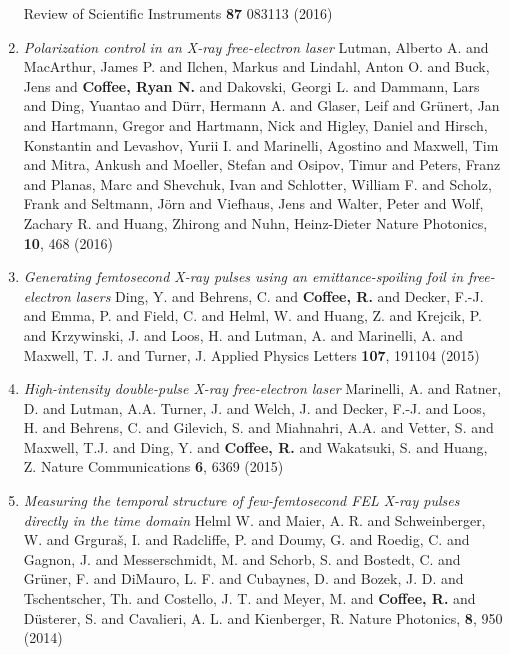 \begin{enumerate}
Review of Scientific Instruments \textbf{87} 083113 (2016)
\item \textit{Polarization control in an X-ray free-electron laser}
Lutman, Alberto A. and MacArthur, James P. and Ilchen, Markus and Lindahl, Anton O. and Buck, Jens and \textbf{Coffee, Ryan N.} and Dakovski, Georgi L. and Dammann, Lars and Ding, Yuantao and Dürr, Hermann A. and Glaser, Leif and Grünert, Jan and Hartmann, Gregor and Hartmann, Nick and Higley, Daniel and Hirsch, Konstantin and Levashov, Yurii I. and Marinelli, Agostino and Maxwell, Tim and Mitra, Ankush and Moeller, Stefan and Osipov, Timur and Peters, Franz and Planas, Marc and Shevchuk, Ivan and Schlotter, William F. and Scholz, Frank and Seltmann, Jörn and Viefhaus, Jens and Walter, Peter and Wolf, Zachary R. and Huang, Zhirong and Nuhn, Heinz-Dieter
Nature Photonics, \textbf{10}, 468 (2016)
\item \textit{Generating femtosecond X-ray pulses using an emittance-spoiling foil in free-electron lasers}
Ding, Y. and Behrens, C. and \textbf{Coffee, R.} and Decker, F.-J. and Emma, P. and Field, C. and Helml, W. and Huang, Z. and Krejcik, P. and Krzywinski, J. and Loos, H. and Lutman, A. and Marinelli, A. and Maxwell, T. J. and Turner, J.
Applied Physics Letters \textbf{107}, 191104 (2015)
\item \textit{High-intensity double-pulse X-ray free-electron laser}
Marinelli, A. and Ratner, D. and Lutman, A.A. Turner, J. and Welch, J. and Decker, F.-J. and Loos, H. and Behrens, C. and Gilevich, S. and Miahnahri, A.A. and Vetter, S. and Maxwell, T.J. and Ding, Y. and \textbf{Coffee, R.} and Wakatsuki, S. and Huang, Z.
Nature Communications \textbf{6}, 6369 (2015)
\item \textit{Measuring the temporal structure of few-femtosecond FEL X-ray pulses directly in the time domain}
Helml W. and Maier, A. R. and Schweinberger, W. and Grgura\v{s}, I. and Radcliffe, P. and Doumy, G. and Roedig, C. and Gagnon, J. and Messerschmidt, M. and Schorb, S. and Bostedt, C. and Gr\"{u}ner, F. and DiMauro, L. F. and Cubaynes, D. and Bozek, J. D. and Tschentscher, Th. and Costello, J. T. and Meyer, M. and \textbf{Coffee, R.} and D\"{u}sterer, S. and Cavalieri, A. L. and Kienberger, R.
Nature Photonics, \textbf{8}, 950 (2014)

\end{enumerate}
